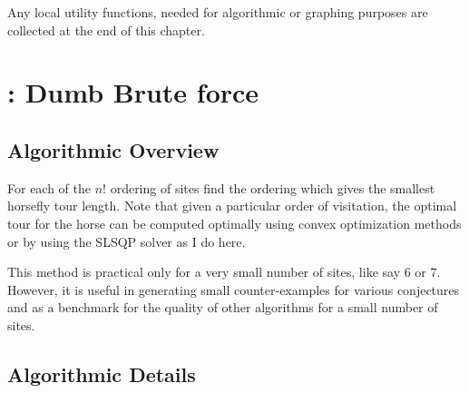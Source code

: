 \documentclass[11.5pt]{report}
\begin{document}
Any local utility functions, needed for algorithmic or graphing purposes 
are collected at the end of this chapter. 

\newpage

\section{: Dumb Brute force}

\subsection{Algorithmic Overview}
For each of the $n!$ ordering of sites find the ordering which gives the smallest horsefly tour length. Note that given 
a particular order of visitation, the optimal tour for the horse can be computed optimally using convex optimization methods
or by using the SLSQP solver as I do here. 

This method is practical only for a very small number of sites, like say 6 or 7. However, it is useful in generating 
small counter-examples for various conjectures and as a benchmark for the quality of other algorithms for a small number 
of sites. 

\subsection{Algorithmic Details}
\end{document}

